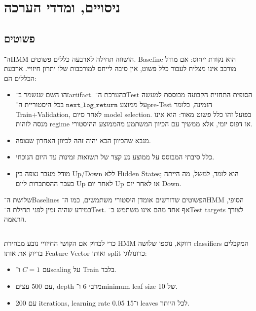 \section{ניסויים,  ומדדי הערכה}

\subsection{ פשוטים}

ה־HMM הושווה תחילה לארבעה כללים פשוטים. Baseline הוא נקודת ייחוס: אם מודל מורכב אינו מצליח לעבור כלל פשוט, אין סיבה לייחס למורכבות שלו יתרון חיזויי. ארבעת הכללים הם:

\begin{itemize}
    \item \textbf{} זהו השם שנשמר ב־artifact. בהערכת ה־Test הסופית התחזית הקבועה מבוססת למעשה על ממוצע \(\texttt{next\_log\_return}\) בכל היסטוריית ה־pre-Test הזמינה, כלומר Train+Validation, לאחר סיום model selection. בפועל זהו כלל פשוט מאוד: הוא אינו מנסה לזהות regime או דפוס יומי, אלא ממשיך עם הכיוון המשתמע מהממוצע ההיסטורי.
    \item \textbf{} מנבא שהכיוון הבא יהיה זהה לכיוון האחרון שנצפה.
    \item \textbf{} כלל סיבתי המבוסס על ממוצע נע קצר של תשואות זמינות עד היום הנוכחי.
    \item \textbf{} מודל מעבר נצפה בין Up/Down ללא Hidden States; הוא לומד, למשל, מה הייתה בעבר ההסתברות ליום Up לאחר יום Up או לאחר יום Down.
\end{itemize}

שלושת ה־Baselines הפשוטים שדורשים אומדן היסטורי משתמשים, כמו ה־HMM הסופי, במידע שהיה זמין לפני תחילת ה־Test. אף אחד מהם אינו משתמש ב־Test targets לצורך התאמה.

\subsection{}

כדי לבדוק אם הקושי החיזויי נובע מבחירת HMM דווקא, נוספו שלושה classifiers המקבלים בדיוק את אותו Feature Vector ואותו split כרונולוגי:

\begin{itemize}
    \item {} עם \(C=1\) ו־scaling על Train בלבד.
    \item {} עם 500 עצים, depth מרבי 6 ו־minimum leaf size של 10.
    \item {} עם 200 iterations, learning rate 0.05 ו־15 leaves לכל היותר.
\end{itemize}

